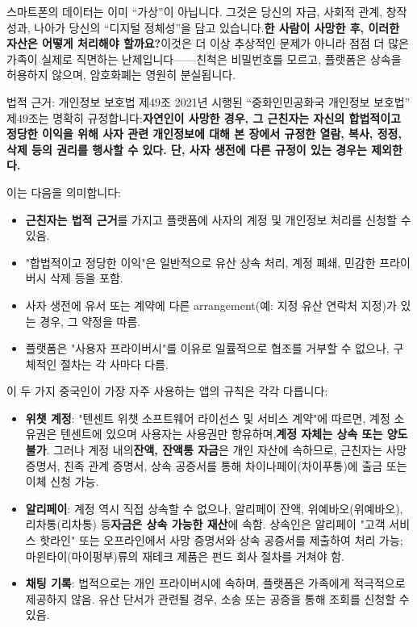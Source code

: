 스마트폰의 데이터는 이미 “가상”이 아닙니다. 그것은 당신의 자금, 사회적 관계, 창작 성과, 나아가 당신의 “디지털 정체성”을 담고 있습니다.\textbf{한 사람이 사망한 후, 이러한 자산은 어떻게 처리해야 할까요?}이것은 더 이상 추상적인 문제가 아니라 점점 더 많은 가족이 실제로 직면하는 난제입니다——친척은 비밀번호를 모르고, 플랫폼은 상속을 허용하지 않으며, 암호화폐는 영원히 분실됩니다.

\begin{tcbinfo}{법적 근거: 개인정보 보호법 제49조}
2021년 시행된 “중화인민공화국 개인정보 보호법” 제49조는 명확히 규정합니다:\textbf{자연인이 사망한 경우, 그 근친자는 자신의 합법적이고 정당한 이익을 위해 사자 관련 개인정보에 대해 본 장에서 규정한 열람, 복사, 정정, 삭제 등의 권리를 행사할 수 있다. 단, 사자 생전에 다른 규정이 있는 경우는 제외한다.}

이는 다음을 의미합니다:

\begin{itemize}
  \item \textbf{근친자는 법적 근거}를 가지고 플랫폼에 사자의 계정 및 개인정보 처리를 신청할 수 있음.
  \item "합법적이고 정당한 이익"은 일반적으로 유산 상속 처리, 계정 폐쇄, 민감한 프라이버시 삭제 등을 포함.
  \item 사자 생전에 유서 또는 계약에 다른 arrangement(예: 지정 유산 연락처 지정)가 있는 경우, 그 약정을 따름.
  \item 플랫폼은 "사용자 프라이버시"를 이유로 일률적으로 협조를 거부할 수 없으나, 구체적인 절차는 각 사마다 다름.
\end{itemize}

\end{tcbinfo}


이 두 가지 중국인이 가장 자주 사용하는 앱의 규칙은 각각 다릅니다:

\begin{itemize}
  \item \textbf{위챗 계정}: "텐센트 위챗 소프트웨어 라이선스 및 서비스 계약"에 따르면, 계정 소유권은 텐센트에 있으며 사용자는 사용권만 향유하며,\textbf{계정 자체는 상속 또는 양도 불가}. 그러나 계정 내의\textbf{잔액, 잔액통 자금}은 개인 자산에 속하므로, 근친자는 사망 증명서, 친족 관계 증명서, 상속 공증서를 통해 차이나페이(차이푸통)에 출금 또는 이체 신청 가능.
  \item \textbf{알리페이}: 계정 역시 직접 상속할 수 없으나, 알리페이 잔액, 위예바오(위예바오), 리차통(리차통) 등\textbf{자금은 상속 가능한 재산}에 속함. 상속인은 알리페이 "고객 서비스 핫라인" 또는 오프라인에서 사망 증명서와 상속 공증서를 제출하여 처리 가능; 마윈타이(마이펑부)류의 재테크 제품은 펀드 회사 절차를 거쳐야 함.
  \item \textbf{채팅 기록}: 법적으로는 개인 프라이버시에 속하며, 플랫폼은 가족에게 적극적으로 제공하지 않음. 유산 단서가 관련될 경우, 소송 또는 공증을 통해 조회를 신청할 수 있음.
\end{itemize}

